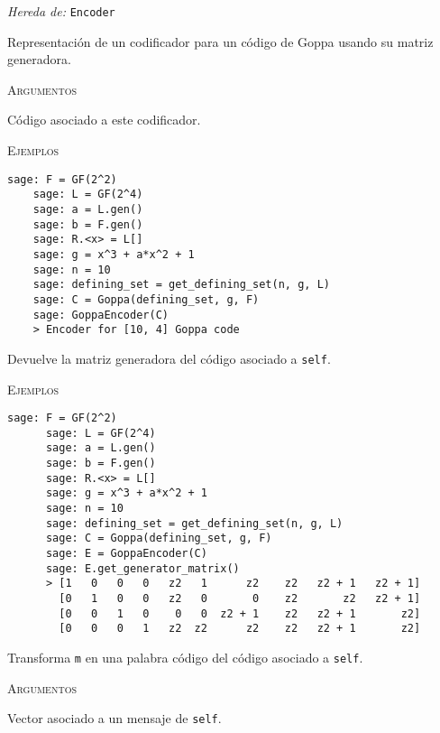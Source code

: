\begin{description}[leftmargin=1em, font=\normalfont\ttfamily, style=nextline]
\item[class GoppaEncoder(self, code)]

\emph{Hereda de:} \texttt{Encoder}

Representación de un codificador para un código de Goppa usando su matriz generadora.

\textsc{Argumentos}
\begin{description}[font=\normalfont\ttfamily]
  \item[code] Código asociado a este codificador.
\end{description}

\textsc{Ejemplos}
  \begin{lstlisting}[gobble=4]
    sage: F = GF(2^2)
    sage: L = GF(2^4)
    sage: a = L.gen()
    sage: b = F.gen()
    sage: R.<x> = L[]
    sage: g = x^3 + a*x^2 + 1
    sage: n = 10
    sage: defining_set = get_defining_set(n, g, L)
    sage: C = Goppa(defining_set, g, F)
    sage: GoppaEncoder(C)
    > Encoder for [10, 4] Goppa code
  \end{lstlisting}

  \begin{description}[font=\ttfamily, style=nextline]
    \item[get\_generator\_matrix(self)] Devuelve la matriz generadora del código asociado a \texttt{self}.

    \textsc{Ejemplos}
    \begin{lstlisting}[gobble=4]
      sage: F = GF(2^2)
      sage: L = GF(2^4)
      sage: a = L.gen()
      sage: b = F.gen()
      sage: R.<x> = L[]
      sage: g = x^3 + a*x^2 + 1
      sage: n = 10
      sage: defining_set = get_defining_set(n, g, L)
      sage: C = Goppa(defining_set, g, F)
      sage: E = GoppaEncoder(C)
      sage: E.get_generator_matrix()
      > [1   0   0   0   z2   1      z2    z2   z2 + 1   z2 + 1]
        [0   1   0   0   z2   0       0    z2       z2   z2 + 1]
        [0   0   1   0    0   0  z2 + 1    z2   z2 + 1       z2]
        [0   0   0   1   z2  z2      z2    z2   z2 + 1       z2]
    \end{lstlisting}

    \item[encode(self, m)] Transforma \texttt{m} en una palabra código del código asociado a \texttt{self}.

    \textsc{Argumentos}
    \begin{description}[font=\normalfont\ttfamily]
        \item[m] Vector asociado a un mensaje de \texttt{self}.
    \end{description}


\end{description}
\end{description}
